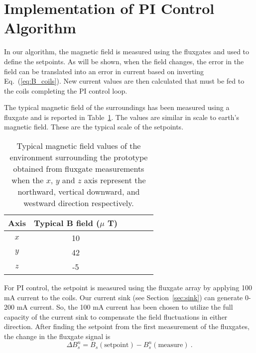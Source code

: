 \section{Implementation of PI Control Algorithm}\label{sec:pi}
 In our algorithm, the magnetic field is measured using the fluxgates and used to define the setpoints. As will be shown, when the field changes, the error in the field can be translated into an error in current based on inverting Eq.~(\ref{eq:B_coils}). New current values are then calculated that must be fed to the coils completing the PI control loop. 


The typical magnetic field of the surroundings has been measured using a fluxgate and is reported in Table~\ref{table:Benvironment}. The values are similar in scale to earth's magnetic field. These are the typical scale of the setpoints.

\begin{table} 
    \centering
    \begin{tabular} { |c|c|c|c|c|c|} 
        \hline
        Axis & \makecell{Typical B field \\($\mu$ T)}\\
        \hline\hline
        $x$ & 10 \\ 
        \hline
        $y$ & 42 \\ 
        \hline
        $z$ & -5 \\ 
        \hline
    \end{tabular}
    \caption[Typical magnetic fields surrounding the prototype]{Typical magnetic field values of the environment surrounding the prototype obtained from fluxgate measurements when the $x$, $y$ and $z$ axis represent the northward, vertical downward, and westward direction respectively. }\label{table:Benvironment}
\end{table}

For PI control, the setpoint is measured using the fluxgate array by applying 100 mA current to the coils. Our current sink (see Section~\ref{sec:sink}) can generate 0-200 mA current. So, the 100 mA current has been chosen to utilize the full capacity of the current sink to compensate the field fluctuations in either direction. After finding the setpoint from the first measurement of the fluxgates, the change in the fluxgate signal is
\begin{equation}\label{eq:del_B}
    \Delta B_s^n = B_s(\mathrm{setpoint}) - B_s^n(\mathrm{measure})~\text{.}
\end{equation}

